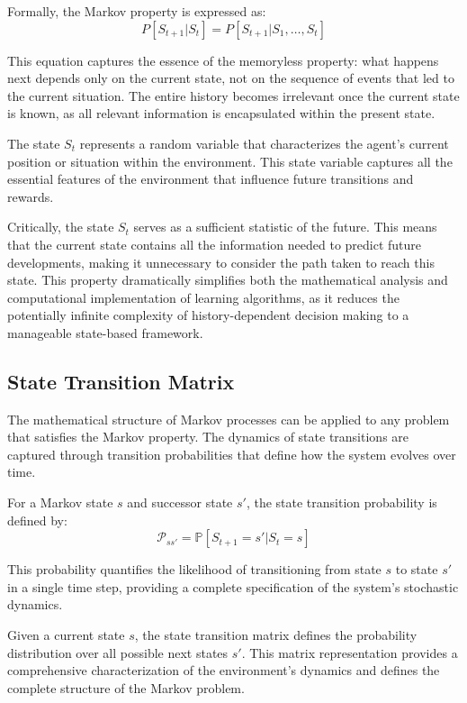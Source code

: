 Formally, the Markov property is expressed as:
\begin{equation}
P[S_{t+1}|S_t] = P[S_{t+1}|S_1, \ldots, S_t]
\end{equation}

This equation captures the essence of the memoryless property: what happens next depends only on the current state, not on the sequence of events that led to the current situation. The entire history becomes irrelevant once the current state is known, as all relevant information is encapsulated within the present state.

The state $S_t$ represents a random variable that characterizes the agent's current position or situation within the environment. This state variable captures all the essential features of the environment that influence future transitions and rewards.

Critically, the state $S_t$ serves as a sufficient statistic of the future. This means that the current state contains all the information needed to predict future developments, making it unnecessary to consider the path taken to reach this state. This property dramatically simplifies both the mathematical analysis and computational implementation of learning algorithms, as it reduces the potentially infinite complexity of history-dependent decision making to a manageable state-based framework.


\subsection{State Transition Matrix}


The mathematical structure of Markov processes can be applied to any problem that satisfies the Markov property. The dynamics of state transitions are captured through transition probabilities that define how the system evolves over time.

For a Markov state $s$ and successor state $s'$, the state transition probability is defined by:
\begin{equation}
\mathcal{P}_{ss'} = \mathbb{P}[S_{t+1} = s' | S_t = s]
\end{equation}

This probability quantifies the likelihood of transitioning from state $s$ to state $s'$ in a single time step, providing a complete specification of the system's stochastic dynamics.

Given a current state $s$, the state transition matrix defines the probability distribution over all possible next states $s'$. This matrix representation provides a comprehensive characterization of the environment's dynamics and defines the complete structure of the Markov problem.

